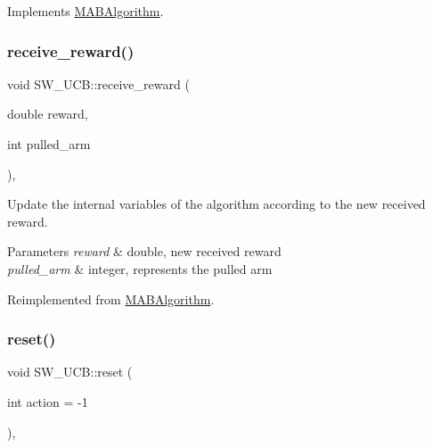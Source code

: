 Implements \mbox{\hyperlink{class_m_a_b_algorithm_afb48f01df0e1860d19759f6e20335007}{M\+A\+B\+Algorithm}}.

\mbox{\label{class_s_w___u_c_b_acddb0c5385d33d332a2fbf1b739142c2}} 
\subsubsection{\texorpdfstring{receive\+\_\+reward()}{receive\_reward()}}
{\footnotesize\ttfamily void S\+W\+\_\+\+U\+C\+B\+::receive\+\_\+reward (\begin{DoxyParamCaption}\item[{double}]{reward,  }\item[{int}]{pulled\+\_\+arm }\end{DoxyParamCaption})\hspace{0.3cm}{\ttfamily [override]}, {\ttfamily [virtual]}}



Update the internal variables of the algorithm according to the new received reward. 


\begin{DoxyParams}{Parameters}
{\em reward} & double, new received reward \\
\hline
{\em pulled\+\_\+arm} & integer, represents the pulled arm \\
\hline
\end{DoxyParams}


Reimplemented from \mbox{\hyperlink{class_m_a_b_algorithm_aa584b3d6b86fa050e3389be9781b5782}{M\+A\+B\+Algorithm}}.

\mbox{\label{class_s_w___u_c_b_afbbe9a17cc00402d2487260b530bbee2}} 
\subsubsection{\texorpdfstring{reset()}{reset()}}
{\footnotesize\ttfamily void S\+W\+\_\+\+U\+C\+B\+::reset (\begin{DoxyParamCaption}\item[{int}]{action = {\ttfamily -\/1} }\end{DoxyParamCaption})\hspace{0.3cm}{\ttfamily [override]}, {\ttfamily [virtual]}}



